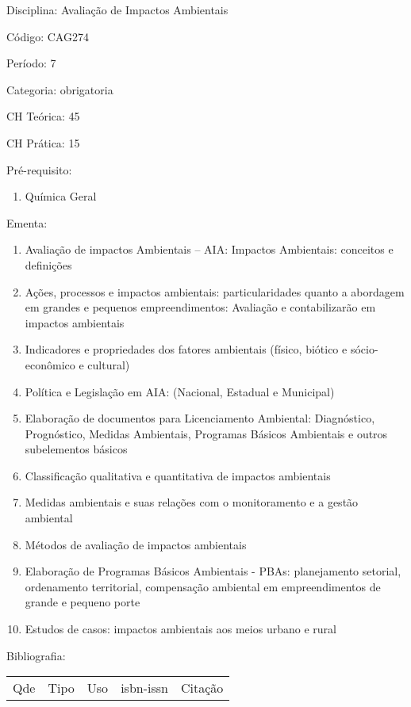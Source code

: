 \documentclass[12pt,a4paper,twoside]{report}
\begin{document}
Disciplina: Avaliação de Impactos Ambientais

Código: CAG274

Período: 7

Categoria: obrigatoria

CH Teórica: 45

CH Prática: 15




Pré-requisito:
\begin{enumerate}
\item Química Geral
\end{enumerate}

Ementa:
\begin{enumerate}
\item Avaliação de impactos Ambientais – AIA: Impactos Ambientais: conceitos e definições
\item Ações, processos e impactos ambientais: particularidades quanto a abordagem em grandes e pequenos empreendimentos: Avaliação e contabilizarão em impactos ambientais
\item Indicadores e propriedades dos fatores ambientais (físico, biótico e sócio-econômico e cultural)
\item Política e Legislação em AIA: (Nacional, Estadual e Municipal)
\item Elaboração de documentos para Licenciamento Ambiental: Diagnóstico, Prognóstico, Medidas Ambientais, Programas Básicos Ambientais e outros subelementos básicos
\item Classificação qualitativa e quantitativa de impactos ambientais
\item Medidas ambientais e suas relações com o monitoramento e a gestão ambiental
\item Métodos de avaliação de impactos ambientais
\item Elaboração de Programas Básicos Ambientais - PBAs: planejamento setorial, ordenamento territorial, compensação ambiental em empreendimentos de grande e pequeno porte
\item Estudos de casos: impactos ambientais aos meios urbano e rural
\end{enumerate}



Bibliografia:


\begin{tabular}{llllp{8cm}}
Qde & Tipo & Uso & isbn-issn & Citação \\
\end{tabular}
\end{document}
